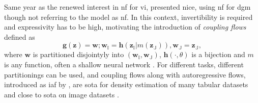 \documentclass[12pt,fleqn,twocolumn]{article}
\begin{document}
Same year as the renewed interest in \acrshort{nf} for \acrshort{vi}, \textcite{Dinh2015NICENI} presented \acrfull{nice}, using \acrshort{nf} for \acrshort{dgm} though not referring to the model as \acrshort{nf}.
In this context, invertibility is required and expressivity has to be high, motivating the introduction of \emph{coupling flows} defined as
\begin{equation}
    \mathbf g(\mathbf z)  = \mathbf w; \mathbf w_{\mathbb I}=\mathbf h(\mathbf z_{\mathbb I} | m(\mathbf z_{\mathbb J})), \mathbf w_{\mathbb J} = \mathbf z_\mathbb J,
\end{equation}
where $\mathbf w$ is partitioned disjointyly into $(\mathbf w_\mathbb I, \mathbf w_\mathbb J)$, $\mathbf h(\cdot, \theta)$ is a bijection and $m$ is any function, often a shallow neural network \cite[Chap. 3]{Dinh2015NICENI}\cite[Chap. 3.4]{koby2021nf}.
For different tasks, different partitionings can be used, and coupling flows along with autoregressive flows, introduced as \acrfull{iaf} by \textcite{Kingma2017ImprovedVI}, are \acrfull{sota} for density estimation of many tabular datasets \cite[Tab. 2]{koby2021nf}and close to \acrshort{sota} on image datasets \cite[Tab. 3]{koby2021nf}.
\end{document}
